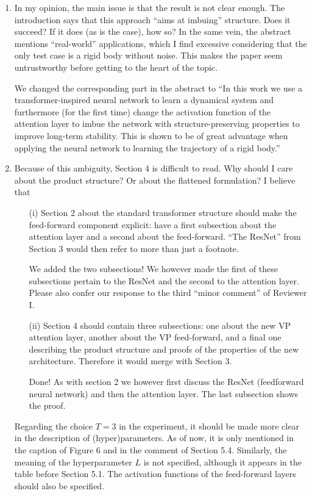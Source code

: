 \documentclass{article}
\begin{document}
\begin{enumerate}
    \item In my opinion, the main issue is that the result is not clear enough. The introduction says that this approach ``aims at imbuing'' structure. Does it succeed? If it does (as is the case), how so? In the same vein, the abstract mentions ``real-world'' applications, which I find excessive considering that the only test case is a rigid body without noise. This makes the paper seem untrustworthy before getting to the heart of the topic.
    
    {\color{mred} We changed the corresponding part in the abstract to ``In this work we use a transformer-inspired neural network to learn a dynamical system and furthermore (for the first time) change the activation function of the attention layer to imbue the network with structure-preserving properties to improve long-term stability. This is shown to be of great advantage when applying the neural network to learning the trajectory of a rigid body.''}

    \item Because of this ambiguity, Section 4 is difficult to read. Why should I care about the product structure? Or about the flattened formulation? I believe that 
    \begin{enumerate} 
    \item[(i)] Section 2 about the standard transformer structure should make the feed-forward component explicit: have a first subsection about the attention layer and a second about the feed-forward. ``The ResNet'' from Section 3 would then refer to more than just a footnote.
    
    {\color{mred} We added the two subsections! We however made the first of these subsections pertain to the ResNet and the second to the attention layer. Please also confer our response to the third ``minor comment'' of Reviewer I.}
    \item[(ii)] Section 4 should contain three subsections: one about the new VP attention layer, another about the VP feed-forward, and a final one describing the product structure and proofs of the properties of the new architecture. Therefore it would merge with Section 3.
    
    {\color{mred} Done! As with section 2 we however first discuss the ResNet (feedforward neural network) and then the attention layer. The last subsection shows the proof.}
    \end{enumerate}
    Regarding the choice $T = 3$ in the experiment, it should be made more clear in the description of (hyper)parameters. As of now, it is only mentioned in the caption of Figure 6 and in the comment of Section 5.4. Similarly, the meaning of the hyperparameter $L$ is not specified, although it appears in the table before Section 5.1. The activation functions of the feed-forward layers should also be specified.
\end{enumerate}
\end{document}
